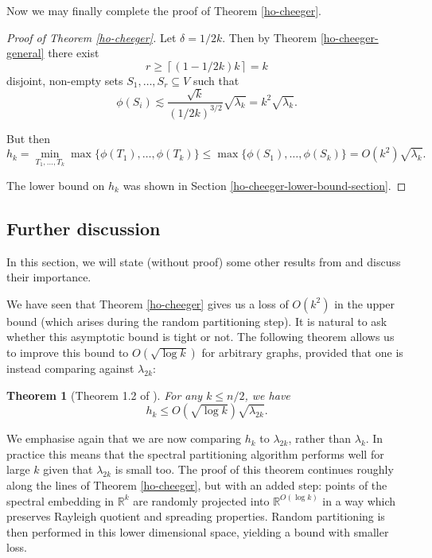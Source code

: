\documentclass[a4paper,11pt]{article}
\newtheorem{theorem}{Theorem}[section]
\theoremstyle{definition}
\newcommand{\R}{\mathbb{R}}
\begin{document}
Now we may finally complete the proof of Theorem \ref{ho-cheeger}.

\begin{proof}[Proof of Theorem \ref{ho-cheeger}]
Let $\delta = 1/2k$. Then by Theorem \ref{ho-cheeger-general} there exist \[r \ge \left\lceil(1-1/2k)k\right\rceil = k\] disjoint, non-empty sets $S_1, \dots, S_r \subseteq V$ such that
\[
\phi(S_i) \lesssim \frac{\sqrt{k}}{\left(1/2k\right)^{3/2}} \sqrt{\lambda_k} = k^2 \sqrt{\lambda_k}.
\]

But then
\[
h_k = \min_{T_1, \dots, T_k} \max \{\phi(T_1), \dots, \phi(T_k)\} \le \max \{\phi(S_1), \dots, \phi(S_k)\} = O(k^2)\sqrt{\lambda_k}.
\]

The lower bound on $h_k$ was shown in Section \ref{ho-cheeger-lower-bound-section}.
\end{proof}

\subsection{Further discussion}

In this section, we will state (without proof) some other results from \cite{main} and discuss their importance.

We have seen that Theorem \ref{ho-cheeger} gives us a loss of $O(k^2)$ in the upper bound (which arises during the random partitioning step). It is natural to ask whether this asymptotic bound is tight or not. The following theorem allows us to improve this bound to $O(\sqrt{\log k})$ for arbitrary graphs, provided that one is instead comparing against $\lambda_{2k}$:

\begin{theorem}[Theorem 1.2 of \cite{main}]\label{thm-1.2-main}
For any $k \le n/2$, we have
\[
h_k \le O(\sqrt{\log k})\sqrt{\lambda_{2k}}.
\]
\end{theorem}

We emphasise again that we are now comparing $h_k$ to $\lambda_{2k}$, rather than $\lambda_k$. In practice this means that the spectral partitioning algorithm performs well for large $k$ given that $\lambda_{2k}$ is small too. The proof of this theorem continues roughly along the lines of Theorem \ref{ho-cheeger}, but with an added step: points of the spectral embedding in $\R^k$ are randomly projected into $\R^{O(\log k)}$ in a way which preserves Rayleigh quotient and spreading properties. Random partitioning is then performed in this lower dimensional space, yielding a bound with smaller loss.
\end{document}

